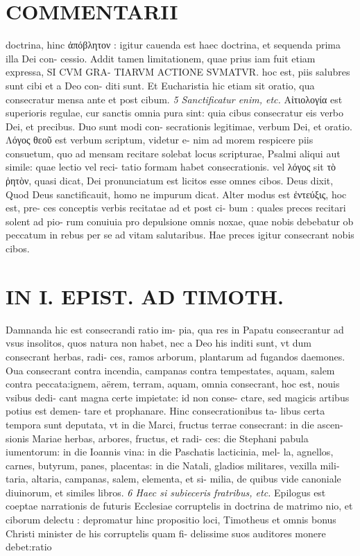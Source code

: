 \documentclass{article}
\begin{document}
\begin{pages}
\section*{COMMENTARII }
\marginpar{[ p.92 ]}\pstart doctrina, hinc ἀπόβλητον : igitur cauenda est haec doctrina, et sequenda prima illa Dei con- cessio. Addit tamen limitationem, quae prius iam fuit etiam expressa, SI CVM GRA- TIARVM ACTIONE SVMATVR. hoc est, piis salubres sunt cibi et a Deo con- diti sunt. Et Eucharistia hic etiam sit oratio, qua consecratur mensa ante et post cibum.  \pend
\textit{5 Sanctificatur enim, etc. }\pstart Αἰτιολογία est superioris regulae, cur sanctis omnia pura sint: quia cibus consecratur eis verbo Dei, et precibus. Duo sunt modi con- secrationis legitimae, verbum Dei, et oratio. Λόγος θεοῦ est verbum scriptum, videtur e- nim ad morem respicere piis consuetum, quo ad mensam recitare solebat locus scripturae, Psalmi aliqui aut simile: quae lectio vel reci- tatio formam habet consecrationis. vel λόγος sit τὸ ῤητὸν, quasi dicat, Dei pronunciatum est licitos esse omnes cibos. Deus dixit, Quod Deus sanctificauit, homo ne impurum dicat. Alter modus est ἐντεύξις, hoc est, pre- ces conceptis verbis recitatae ad et post ci- bum : quales preces recitari solent ad pio- rum conuiuia pro depulsione omnis noxae, quae nobis debebatur ob peccatum in rebus per se ad vitam salutaribus. Hae preces igitur consecrant nobis cibos.  \pend
\section*{IN I. EPIST. AD TIMOTH. }
\marginpar{[ p.93 ]}\pstart Damnanda hic est consecrandi ratio im- pia, qua res in Papatu consecrantur ad vsus insolitos, quos natura non habet, nec a Deo his inditi sunt, vt dum consecrant herbas, radi- ces, ramos arborum, plantarum ad fugandos daemones. Oua consecrant contra incendia, campanas contra tempestates, aquam, salem contra peccata:ignem, aërem, terram, aquam, omnia consecrant, hoc est, nouis vsibus dedi- cant magna certe impietate: id non conse- ctare, sed magicis artibus potius est demen- tare et prophanare. Hinc consecrationibus ta- libus certa tempora sunt deputata, vt in die Marci, fructus terrae consecrant: in die ascen- sionis Mariae herbas, arbores, fructus, et radi- ces: die Stephani pabula iumentorum: in die Ioannis vina: in die Paschatis lacticinia, mel- la, agnellos, carnes, butyrum, panes, placentas: in die Natali, gladios militares, vexilla mili- taria, altaria, campanas, salem, elementa, et si- milia, de quibus vide canoniale diuinorum, et similes libros.  \pend
\textit{6 Haec si subieceris fratribus, etc. }\pstart Epilogus est coeptae narrationis de futuris Ecclesiae corruptelis in doctrina de matrimo nio, et ciborum delectu : depromatur hinc propositio loci, Timotheus et omnis bonus Christi minister de his corruptelis quam fi- delissime suos auditores monere debet:ratio  \pend

\end{pages}
\end{document}
